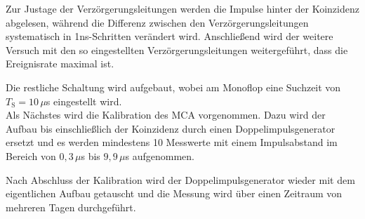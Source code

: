         Zur Justage der Verzörgerungsleitungen werden die Impulse hinter der Koinzidenz abgelesen, während die Differenz zwischen den Verzörgerungsleitungen systematisch in 1ns-Schritten verändert wird. Anschließend wird der weitere Versuch mit den so eingestellten Verzörgerungsleitungen weitergeführt, dass die Ereignisrate maximal ist.

        Die restliche Schaltung wird aufgebaut, wobei am Monoflop eine Suchzeit von $T_{\text{S}} = 10 \, \mu$s eingestellt wird. \\
        Als Nächstes wird die Kalibration des MCA vorgenommen. Dazu wird der Aufbau bis einschließlich der Koinzidenz durch einen Doppelimpulsgenerator ersetzt und es werden mindestens 10 Messwerte mit einem Impulsabstand im Bereich von $0,3 \, \mu$s bis $9,9 \, \mu$s aufgenommen.

        Nach Abschluss der Kalibration wird der Doppelimpulsgenerator wieder mit dem eigentlichen Aufbau getauscht und die Messung wird über einen Zeitraum von mehreren Tagen durchgeführt. \cite{tu_dortmund_versuchsanleitung_2021-1}
